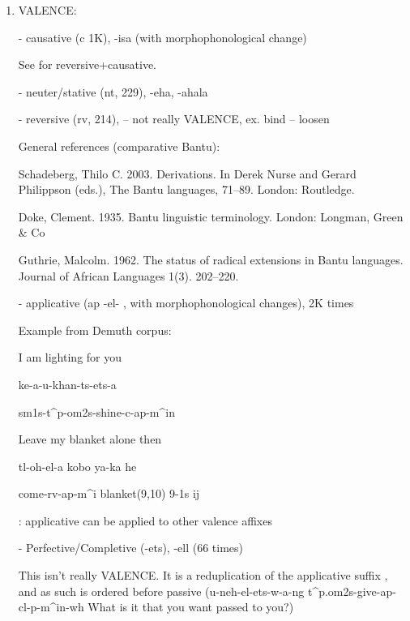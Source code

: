 \documentclass[11pt,letterpaper]{article}
\begin{document}
\begin{enumerate}
    \item VALENCE:
    
    
    
    - causative (c 1K), -isa (with morphophonological change) \cite[]{doke1967textbook}
    
    See \cite[]{doke1967textbook} for reversive+causative.
    
    - neuter/stative (nt, 229), -eha, -ahala \cite[]{doke1967textbook}
    
    
    - reversive (rv, 214),  \cite[]{doke1967textbook} -- not really VALENCE, ex. bind -- loosen
    
    General references (comparative Bantu):

Schadeberg, Thilo C. 2003. Derivations. In Derek Nurse and Gerard Philippson (eds.), The
Bantu languages, 71–89. London: Routledge.

Doke, Clement. 1935. Bantu linguistic terminology. London: Longman, Green \& Co

Guthrie, Malcolm. 1962. The status of radical extensions in Bantu languages. Journal of
African Languages 1(3). 202–220.

    
    
    - applicative
    (ap -el- \cite[]{doke1967textbook} \cite[p. 109]{lombard1969handbook}, with morphophonological changes), 2K times
    
    Example from Demuth corpus: 
    
    I am lighting for you
    
    ke-a-u-khan-ts-ets-a
    
    sm1s-t\^{}p-om2s-shine-c-ap-m\^{}in
    
    
    Leave my blanket alone then
    
    tl-oh-el-a kobo ya-ka he
    
    come-rv-ap-m\^{}i blanket(9,10) 9-1s ij
    
    
    \cite[-315]{doke1967textbook}: applicative can be applied to other valence affixes
    
    -  Perfective/Completive (-ets), -ell (66 times) \cite[]{doke1967textbook}
    
    This isn't really VALENCE. It is a reduplication of the applicative suffix \cite[]{doke1967textbook}, and as such is ordered before passive (u-neh-el-ets-w-a-ng t\^{}p.om2s-give-ap-cl-p-m\^{}in-wh What is it that you want passed to you?)
    

\end{enumerate}
\end{document}
